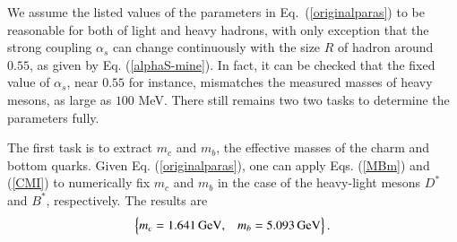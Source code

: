 \documentclass[prt,twocolumn,floatfix,nofootinbib]{revtex4}
\begin{document}
We assume the listed values of the parameters in Eq.~(\ref{originalparas}) to be reasonable for both of light and heavy hadrons,
with only exception that the strong coupling $\alpha_{s}$ can change continuously with the size $R$ of hadron around $0.55$, as given by Eq. (\ref{alphaS-mine}).
In fact, it can be checked that the fixed value of $\alpha_{s}$, near $0.55$ for instance, mismatches the measured masses of heavy mesons, as large as $100$ MeV. There still remains two two tasks to determine the parameters fully.

The first task is to extract $m_{c}$ and $m_{b}$, the effective masses of the charm and bottom quarks. Given Eq. (\ref{originalparas}), one can apply Eqs. (\ref{MBm}) and (\ref{CMI}) to numerically fix $m_{c}$ and $m_{b}$ in the case of  the heavy-light mesons $D^{\ast}$ and $B^{\ast}$, respectively. The results are
\begin{equation}\label{mcmb}
    \begin{Bmatrix}
        m_{c}=1.641\,{\rm GeV}, & m_{b}=5.093\,{\rm GeV}
    \end{Bmatrix}.
\end{equation}
\end{document}
